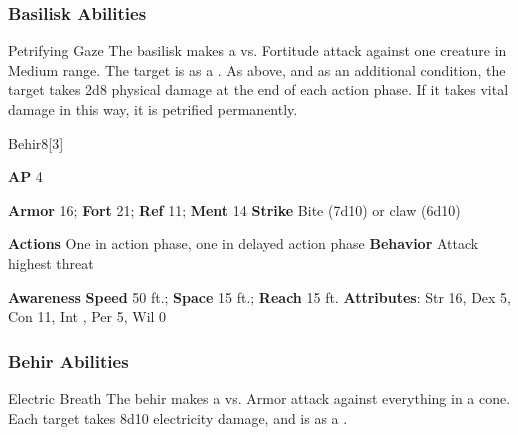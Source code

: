 \subsubsection{Basilisk Abilities}

\begin{freeability}{Petrifying Gaze}
The basilisk makes a  vs. Fortitude attack against one creature in Medium range.
\hit The target is  as a .
\crit As above, and as an additional condition, the target takes 2d8 physical damage at the end of each action phase.
If it takes vital damage in this way, it is petrified permanently.
\end{freeability}

\begin{monsection}{Behir}{8}[3]
\vspace{-1em}\vspace{-1em}
\begin{spellcontent}
\begin{spelltargetinginfo}
{\textbf{AP} 4}

\pari \textbf{Armor} 16;
\textbf{Fort} 21;
\textbf{Ref} 11;
\textbf{Ment} 14
\pari \textbf{Strike} Bite  (7d10) or claw  (6d10)


\pari \textbf{Actions} One in action phase, one in delayed action phase
\pari \textbf{Behavior} Attack highest threat
\end{spelltargetinginfo}
\end{spellcontent}

\begin{monsterfooter}
\pari \textbf{Awareness} 
\pari \textbf{Speed} 50 ft.;
\textbf{Space} 15 ft.;
\textbf{Reach} 15 ft.
\pari \textbf{Attributes}:
Str 16,
Dex 5,
Con 11,
Int ,
Per 5,
Wil 0
\end{monsterfooter}
\end{monsection}


\subsubsection{Behir Abilities}

\begin{freeability}{Electric Breath}
The behir makes a  vs. Armor attack against everything in a \areamed cone.
\hit Each target takes 8d10 electricity damage, and is  as a .
\end{freeability}


